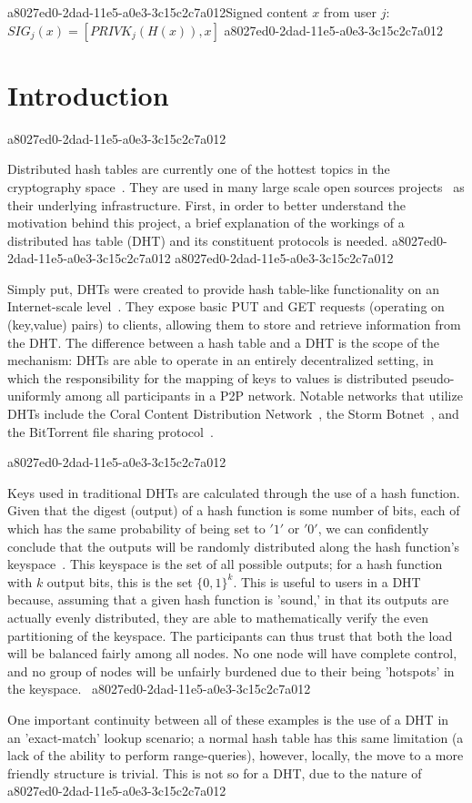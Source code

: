 \documentclass[12pt]{article}
\begin{document}
a8027ed0-2dad-11e5-a0e3-3c15c2c7a012Signed content $x$ from user $j$: $SIG_j(x) = \left[ PRIVK_j( H(x) ), x \right]$
a8027ed0-2dad-11e5-a0e3-3c15c2c7a012
\section{Introduction}
a8027ed0-2dad-11e5-a0e3-3c15c2c7a012\par Distributed hash tables are currently one of the hottest topics in the cryptography space~\cite{Stoica:2001dj,Rowstron:2001ea,Ratnasamy:2001wn}. They are used in many large scale open sources projects~\cite{Freitas:2013tb,Xu:2010vs,Perfitt:2010fh} as their underlying infrastructure. First, in order to better understand the motivation behind this project, a brief explanation of the workings of a distributed has table (DHT) and its constituent protocols is needed.
a8027ed0-2dad-11e5-a0e3-3c15c2c7a012
a8027ed0-2dad-11e5-a0e3-3c15c2c7a012\par Simply put, DHTs were created to provide hash table-like functionality on an Internet-scale level~\cite{Ratnasamy:2001wn}. They expose basic PUT and GET requests (operating on (key,value) pairs) to clients, allowing them to store and retrieve information from the DHT. The difference between a hash table and a DHT is the scope of the mechanism: DHTs are able to operate in an entirely decentralized setting, in which the responsibility for the mapping of keys to values is distributed pseudo-uniformly among all participants in a P2P network. Notable networks that utilize DHTs include the Coral Content Distribution Network~\cite{Freedman:2004vb}, the Storm Botnet~\cite{Holz:2008uk}, and the BitTorrent file sharing protocol~\cite{Cohen:y1_8mBnw}.

a8027ed0-2dad-11e5-a0e3-3c15c2c7a012\par Keys used in traditional DHTs are calculated through the use of a hash function. Given that the digest (output) of a hash function is some number of bits, each of which has the same probability of being set to $'1'$ or $'0'$, we can confidently conclude that the outputs will be randomly distributed along the hash function's keyspace~. This keyspace is the set of all possible outputs; for a hash function with $k$ output bits, this is the set $\{0,1\}^k$. This is useful to users in a DHT because, assuming that a given hash function is 'sound,' in that its outputs are actually evenly distributed, they are able to mathematically verify the even partitioning of the keyspace. The participants can thus trust that both the load will be balanced fairly among all nodes. No one node will have complete control, and no group of nodes will be unfairly burdened due to their being 'hotspots' in the keyspace.~
a8027ed0-2dad-11e5-a0e3-3c15c2c7a012
\par One important continuity between all of these examples is the use of a DHT in an 'exact-match' lookup scenario; a normal hash table has this same limitation (a lack of the ability to perform range-queries), however, locally, the move to a more friendly structure is trivial. This is not so for a DHT, due to the nature of
a8027ed0-2dad-11e5-a0e3-3c15c2c7a012\printbibliography
\end{document}
